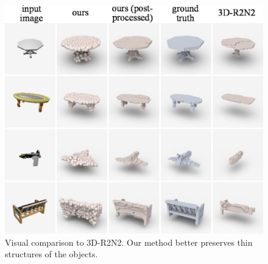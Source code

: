 \label{sec:exp}






\begin{figure}[t!]
  \centering
  \includegraphics[width=\linewidth]{./fig/show_r2n2}
  \caption{Visual comparison to 3D-R2N2. Our method better preserves thin structures of the objects. }\label{fig:visual_comparison}
\end{figure}

